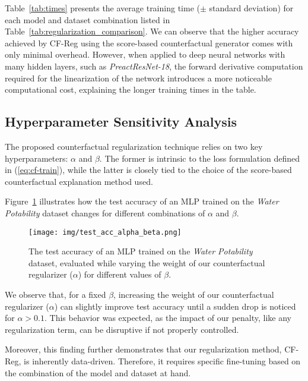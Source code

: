 Table~\ref{tab:times} presents the average training time ($\pm$ standard deviation) for each model and dataset combination listed in Table~\ref{tab:regularization_comparison}.
We can observe that the higher accuracy achieved by CF-Reg using the score-based counterfactual generator comes with only minimal overhead. However, when applied to deep neural networks with many hidden layers, such as \textit{PreactResNet-18}, the forward derivative computation required for the linearization of the network introduces a more noticeable computational cost, explaining the longer training times in the table.

\subsection{Hyperparameter Sensitivity Analysis}
The proposed counterfactual regularization technique relies on two key hyperparameters: $\alpha$ and $\beta$. The former is intrinsic to the loss formulation defined in (\ref{eq:cf-train}), while the latter is closely tied to the choice of the score-based counterfactual explanation method used.

Figure~\ref{fig:test_alpha_beta} illustrates how the test accuracy of an MLP trained on the \textit{Water Potability} dataset changes for different combinations of $\alpha$ and $\beta$.

\begin{figure}[ht]
    \centering
    \texttt{[image: img/test\_acc\_alpha\_beta.png]}
    \caption{The test accuracy of an MLP trained on the \textit{Water Potability} dataset, evaluated while varying the weight of our counterfactual regularizer ($\alpha$) for different values of $\beta$.}
    \label{fig:test_alpha_beta}
\end{figure}

We observe that, for a fixed $\beta$, increasing the weight of our counterfactual regularizer ($\alpha$) can slightly improve test accuracy until a sudden drop is noticed for $\alpha > 0.1$.
This behavior was expected, as the impact of our penalty, like any regularization term, can be disruptive if not properly controlled.

Moreover, this finding further demonstrates that our regularization method, CF-Reg, is inherently data-driven. Therefore, it requires specific fine-tuning based on the combination of the model and dataset at hand.